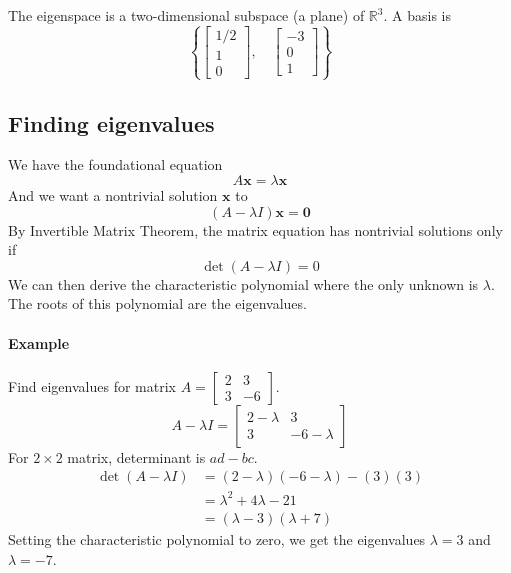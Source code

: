 \documentclass[../linear-algebra.tex]{subfiles}
\begin{document}
The eigenspace is a two-dimensional subspace (a plane) of $\mathbb{R}^3$. A basis is
$$\left\{\begin{bmatrix} 1/2 \\ 1 \\ 0 \end{bmatrix}, \quad \begin{bmatrix} -3 \\ 0 \\ 1 \end{bmatrix}\right\}$$

\subsection{Finding eigenvalues}
We have the foundational equation
$$A\mathbf{x} = \lambda\mathbf{x}$$
And we want a nontrivial solution $\mathbf{x}$ to
$$(A - \lambda I)\mathbf{x} = \mathbf{0}$$
By Invertible Matrix Theorem, the matrix equation has nontrivial solutions only if
$$\det(A - \lambda I) = 0$$
We can then derive the characteristic polynomial where the only unknown is $\lambda$. The roots of this polynomial are the eigenvalues.
\paragraph{Example} Find eigenvalues for matrix $A = \begin{bmatrix} 2 & 3 \\ 3 & -6 \end{bmatrix}$.\\
$$A - \lambda I = \begin{bmatrix} 2-\lambda & 3 \\ 3 & -6-\lambda \end{bmatrix}$$
For $2\times 2$ matrix, determinant is $ad-bc$.
\begin{align*}
    \det(A - \lambda I) &= (2-\lambda)(-6-\lambda) - (3)(3)\\
    &= \lambda^2 + 4\lambda - 21\\
    &= (\lambda - 3)(\lambda + 7)
\end{align*}
Setting the characteristic polynomial to zero, we get the eigenvalues $\lambda = 3$ and $\lambda = -7$.

\end{document}
